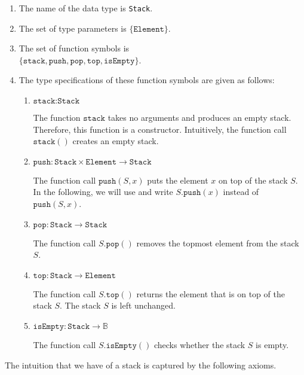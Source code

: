 \begin{enumerate}
\item The name of the data type is \texttt{Stack}.
\item The set of type parameters is $\{ \texttt{Element} \}$.
\item The set of function symbols is \\[0.2cm]
      \hspace*{1.3cm} 
      $\bigl\{ \texttt{stack}, \texttt{push}, \texttt{pop}, \texttt{top}, \texttt{isEmpty} \bigr\}$.
\item The type specifications of these function symbols are given as follows:
      \begin{enumerate}
      \item $\texttt{stack}: \texttt{Stack}$

            The function $\texttt{stack}$ takes no arguments and produces an empty stack.
            Therefore, this function is a constructor.  Intuitively, the function call $\texttt{stack}()$ 
            creates an empty stack.
      \item $\texttt{push}: \texttt{Stack} \times \texttt{Element} \rightarrow \texttt{Stack}$

            The function call $\texttt{push}(S,x)$ puts the element $x$ on top of the stack $S$.  In
            the following, we will use  and write 
            $S.\texttt{push}(x)$ instead of $\texttt{push}(S,x)$.
      \item $\texttt{pop}: \texttt{Stack}  \rightarrow \texttt{Stack}$

            The function call $S.\texttt{pop}()$ removes the topmost element from the stack $S$.
      \item $\texttt{top}: \texttt{Stack} \rightarrow \texttt{Element}$

            The function call $S.\texttt{top}()$ returns the element that is on top of the stack $S$. 
            The stack $S$ is left unchanged.
     \item $\texttt{isEmpty}: \texttt{Stack} \rightarrow \mathbb{B}$

            The function call $S.\texttt{isEmpty}()$ checks whether the stack $S$ is empty.
      \end{enumerate}
\end{enumerate}
The intuition that we have of a stack is captured by the following axioms.
